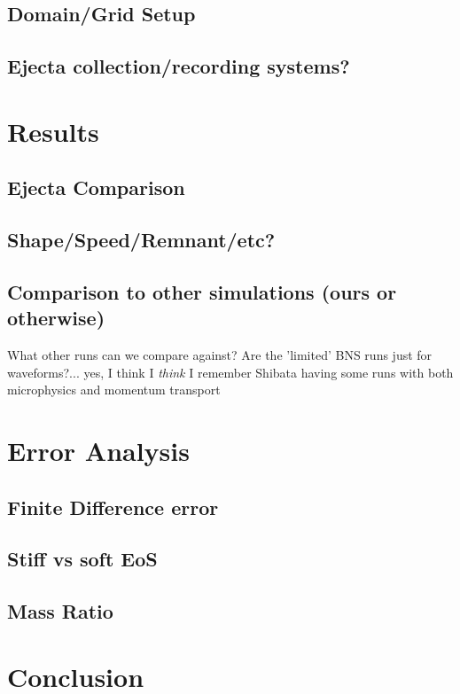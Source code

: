 \documentclass[%
twocolumn,
superscriptaddress,
nofootinbib,
 amsmath,amssymb,
 aps, prd
]{revtex4-2}
\begin{document}
  \subsection{Domain/Grid Setup}
  \subsection{Ejecta collection/recording systems?}

\section{Results}
  \subsection{Ejecta Comparison}
  \subsection{Shape/Speed/Remnant/etc?}
  \subsection{Comparison to other simulations (ours or otherwise)}
      What other runs can we compare against? Are the 'limited' BNS runs just for waveforms?... yes, I think
      I \textit{think} I remember Shibata having some runs with both microphysics and momentum transport

\section{Error Analysis}
  \subsection{Finite Difference error}
  \subsection{Stiff vs soft EoS}
  \subsection{Mass Ratio}

\section{Conclusion}




\end{document}
